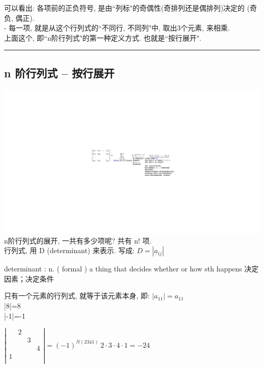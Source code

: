 \documentclass[UTF8]{ctexart}
\begin{document}
	可以看出: 各项前的正负符号, 是由``列标"的奇偶性(奇排列还是偶排列)决定的 (奇负, 偶正).\\
	- 每一项, 就是从这个行列式的``不同行, 不同列"中, 取出3个元素, 来相乘.\\
	
	上面这个, 即``n阶行列式"的第一种定义方式. 也就是``按行展开".\\
	
	

	\hrule

	
	
	\subsection{n 阶行列式 -- 按行展开}
	
	\includegraphics[width=1\textwidth]{img/0003.pdf}\\
	
	n阶行列式的展开, 一共有多少项呢? 共有 n! 项. \\
	
	行列式, 用 D (determinant) 来表示. 写成: $	D=\left| a_{ij} \right|	$
	
	\begin{myEnvSample}
	determinant : n. ( formal ) a thing that decides whether or how sth happens 决定因素；决定条件
	\end{myEnvSample}

	只有一个元素的行列式, 就等于该元素本身, 即:	$	\left| a_{11} \right|=a_{11}	$\\
	|8|=8\\
	|-1|=-1\\
	
	\begin{myEnvSample}
$
\left| \begin{matrix}
	&		2&		&		\\
	&		&		3&		\\
	&		&		&		4\\
	1&		&		&		\\
\end{matrix} \right|=\left( -1 \right) ^{N\left( 2341 \right)}\ 2\cdot 3\cdot 4\cdot 1=-24
$
	\end{myEnvSample}
	
\end{document}
